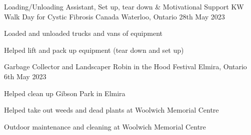 

\begin{cventries}

  \cventry
    {Loading/Unloading Assistant, Set up, tear down \& Motivational Support} %
    {KW Walk Day for Cystic Fibrosis Canada} %
    {Waterloo, Ontario} %
    {28th May 2023} %
    {
      \begin{cvitems} %
        \item {Loaded and unloaded trucks and vans of equipment}
        \item {Helped lift and pack up equipment (tear down and set up)}
      \end{cvitems}
    }

  \cventry
    {Garbage Collector and Landscaper} %
    {Robin in the Hood Festival} %
    {Elmira, Ontario} %
    {6th May 2023} %
    {
      \begin{cvitems} %
        \item {Helped clean up Gibson Park in Elmira}
        \item {Helped take out weeds and dead plants at Woolwich Memorial Centre}
        \item {Outdoor maintenance and cleaning at Woolwich Memorial Centre}
      \end{cvitems}
    }

\end{cventries}
